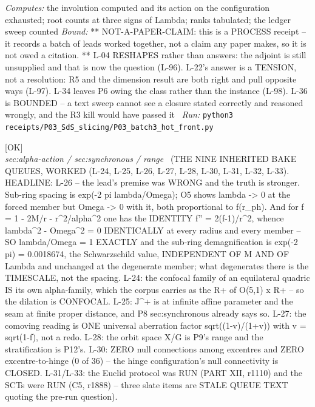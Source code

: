 \begin{description}
\emph{Computes:} the involution computed and its action on the configuration exhausted; root counts at three signs of Lambda; ranks tabulated; the ledger sweep counted
 \emph{Bound:} ** NOT-A-PAPER-CLAIM: this is a PROCESS receipt -- it records a batch of leads worked together, not a claim any paper makes, so it is not owed a citation. ** L-04 RESHAPES rather than answers: the adjoint is still unsupplied and that is now the question (L-96). L-22's answer is a TENSION, not a resolution: R5 and the dimension result are both right and pull opposite ways (L-97). L-34 leaves P6 owing the class rather than the instance (L-98). L-36 is BOUNDED -- a text sweep cannot see a closure stated correctly and reasoned wrongly, and the R3 kill would have passed it
\ \emph{Run:} \texttt{python3 receipts/P03\_SdS\_slicing/P03\_batch3\_hot\_front.py}
\item[\label{rcpt:P03_slate_worked}\texttt{P03\_slate\_worked}]\hfill\textsf{[OK]}\\
\textit{sec:alpha-action / sec:synchronous / range} \ (THE NINE INHERITED BAKE QUEUES, WORKED (L-24, L-25, L-26, L-27, L-28, L-30, L-31, L-32, L-33). HEADLINE: L-26 -- the lead's premise was WRONG and the truth is stronger. Sub-ring spacing is exp(-2 pi lambda/Omega); O5 shows lambda -> 0 at the forced member but Omega -> 0 with it, both proportional to f(r\_ph). And for f = 1 - 2M/r - r\textasciicircum{}2/alpha\textasciicircum{}2 one has the IDENTITY f'' = 2(f-1)/r\textasciicircum{}2, whence lambda\textasciicircum{}2 - Omega\textasciicircum{}2 = 0 IDENTICALLY at every radius and every member -- SO lambda/Omega = 1 EXACTLY and the sub-ring demagnification is exp(-2 pi) = 0.0018674, the Schwarzschild value, INDEPENDENT OF M AND OF Lambda and unchanged at the degenerate member; what degenerates there is the TIMESCALE, not the spacing. L-24: the confocal family of an equilateral quadric IS its own alpha-family, which the corpus carries as the R+ of O(5,1) x R+ -- so the dilation is CONFOCAL. L-25: J\textasciicircum{}+ is at infinite affine parameter and the seam at finite proper distance, and P8 sec:synchronous already says so. L-27: the comoving reading is ONE universal aberration factor sqrt((1-v)/(1+v)) with v = sqrt(1-f), not a redo. L-28: the orbit space X/G is P9's range and the stratification is P12's. L-30: ZERO null connections among excentres and ZERO excentre-to-hinge (0 of 36) -- the hinge configuration's null connectivity is CLOSED. L-31/L-33: the Euclid protocol was RUN (PART XII, r1110) and the SCTs were RUN (C5, r1888) -- three slate items are STALE QUEUE TEXT quoting the pre-run question). 

\end{description}
